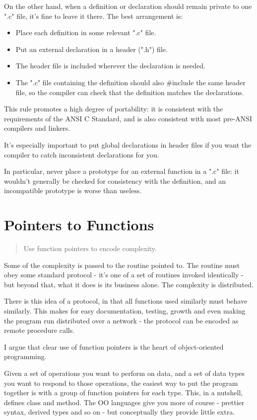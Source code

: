 \documentclass{report}
\begin{document}
On the other hand, when a definition or declaration should remain private to one ".c" file, it's fine to leave it there. The best arrangement is:
\begin{itemize}
\item Place each definition in some relevant ".c" file.
\item Put an external declaration in a header (".h") file.
\item The header file is included wherever the declaration is needed.
\item The ".c" file containing the definition should also \#include the same header file, so the compiler can check that the definition matches the declarations.
\end{itemize}
This rule promotes a high degree of portability: it is consistent with the requirements of the ANSI C Standard, and is also consistent with most pre-ANSI compilers and linkers.

It's especially important to put global declarations in header files if you want the compiler to catch inconsistent declarations for you.

In particular, never place a prototype for an external function in a ".c" file: it wouldn't generally be checked for consistency with the definition, and an incompatible prototype is worse than useless.

\section{Pointers to Functions}
\begin{quote}
Use function pointers to encode complexity.
\end{quote}
Some of the complexity is passed to the routine pointed to. The routine must obey some standard protocol - it's one of a set of routines invoked identically - but beyond that, what it does is its business alone. The complexity is distributed.

There is this idea of a protocol, in that all functions used similarly must behave similarly. This makes for easy documentation, testing, growth and even making the program run distributed over a network - the protocol can be encoded as remote procedure calls.

I argue that clear use of function pointers is the heart of object-oriented programming.
 
Given a set of operations you want to perform on data, and a set of data types you want to respond to those operations, the easiest way to put the program together is with a group of function pointers for each type. This, in a nutshell, defines class and method. The OO languages give you more of course - prettier syntax, derived types and so on - but conceptually they provide little extra.
\end{document}
